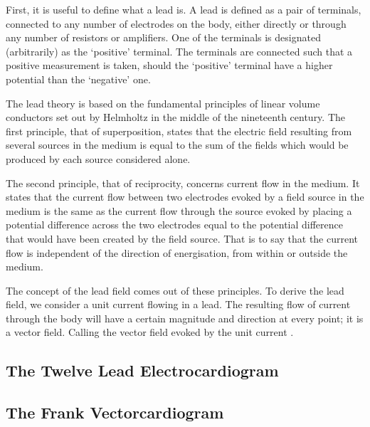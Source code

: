 First, it is useful to define what a lead is.
A lead is defined as a pair of terminals, connected to any number of electrodes
on the body, either directly or through any number of resistors or amplifiers.
One of the terminals is designated (arbitrarily) as the `positive' terminal.
The terminals are connected such that a positive measurement is taken, should
the `positive' terminal have a higher potential than the `negative' one.

The lead theory is based on the fundamental principles of linear volume
conductors set out by Helmholtz in the middle of the nineteenth century.
The first principle, that of superposition, states that the electric field
resulting from several sources in the medium is equal to the sum of the fields
which would be produced by each source considered alone.

The second principle, that of reciprocity, concerns current flow in the
medium.
It states that the current flow between two electrodes evoked by a field source in the
medium is the same as the current flow through the source evoked by placing a
potential difference across the two electrodes equal to the potential difference
that would have been created by the field source.
That is to say that the current flow is independent of the direction of
energisation, from within or outside the medium.

The concept of the lead field comes out of these principles.
To derive the lead field, we consider a unit current flowing in a lead.
The resulting flow of current through the body will have a certain magnitude and
direction at every point; it is a vector field.
Calling the vector field evoked by the unit current .

\subsection{The Twelve Lead Electrocardiogram}

\subsection{The Frank Vectorcardiogram}


